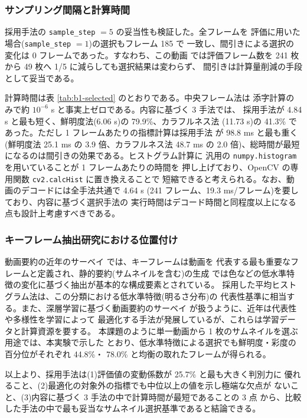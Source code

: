 \subsubsection{サンプリング間隔と計算時間}

採用手法の {\tt sample\_step} $= 5$ の妥当性も検証した。全フレームを
評価に用いた場合({\tt sample\_step} $= 1$)の選択もフレーム 185 で
一致し、間引きによる選択の変化は 0 フレームであった。すなわち、この動画
では評価フレーム数を 241 枚から 49 枚へ 1/5 に減らしても選択結果は変わらず、
間引きは計算量削減の手段として妥当である。

計算時間は表 \ref{tab:b1-selected} のとおりである。中央フレーム法は
添字計算のみで約 $10^{-6}$ s と事実上ゼロである。内容に基づく 3 手法では、
採用手法が 4.84 s と最も短く、鮮明度法(6.06 s)の 79.9\%、カラフルネス法
(11.73 s)の 41.3\% であった。ただし 1 フレームあたりの指標計算は採用手法
が 98.8 ms と最も重く(鮮明度法 25.1 ms の 3.9 倍、カラフルネス法 48.7 ms
の 2.0 倍)、総時間が最短になるのは間引きの効果である。ヒストグラム計算に
汎用の {\tt numpy.histogram} を用いていることが 1 フレームあたりの時間を
押し上げており、OpenCV の専用関数 {\tt cv2.calcHist} に置き換えることで
短縮できると考えられる。なお、動画のデコードには全手法共通で 4.64 s
(241 フレーム、19.3 ms/フレーム)を要しており、内容に基づく選択手法の
実行時間はデコード時間と同程度以上になる点も設計上考慮すべきである。

\subsubsection{キーフレーム抽出研究における位置付け}

動画要約の近年のサーベイ \cite{b1-tiwari2021} では、キーフレームは動画を
代表する最も重要なフレームと定義され、静的要約(サムネイルを含む)の生成
では色などの低水準特徴の変化に基づく抽出が基本的な構成要素とされている。
採用した平均ヒストグラム法は、この分類における低水準特徴(明るさ分布)の
代表性基準に相当する。また、深層学習に基づく動画要約のサーベイ
\cite{b1-apostolidis2021} が扱うように、近年は代表性や多様性を学習によって
最適化する手法が発展しているが、これらは学習データと計算資源を要する。
本課題のように単一動画から 1 枚のサムネイルを選ぶ用途では、本実験で示した
とおり、低水準特徴による選択でも鮮明度・彩度の百分位がそれぞれ 44.8\%・
78.0\% と均衡の取れたフレームが得られる。

以上より、採用手法は(1)評価値の変動係数が 25.7\% と最も大きく判別力に
優れること、(2)最適化の対象外の指標でも中位以上の値を示し極端な欠点が
ないこと、(3)内容に基づく 3 手法の中で計算時間が最短であることの 3 点
から、比較した手法の中で最も妥当なサムネイル選択基準であると結論できる。
